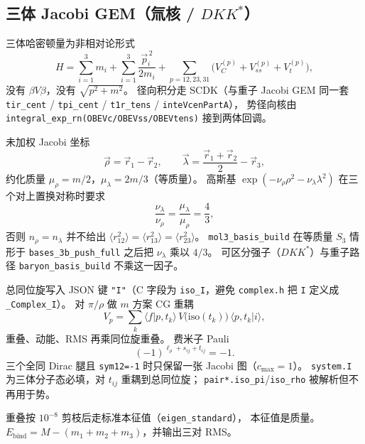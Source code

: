 \documentclass[12pt,a4paper]{article}
\begin{document}
\subsection{\texorpdfstring{三体 Jacobi GEM（氚核 / $DKK^*$）}{三体 Jacobi GEM（氚核 / DKK*）}}

三体哈密顿量为非相对论形式
\begin{equation}
\label{eq:H3}
  H=\sum_{i=1}^3 m_i
  +\sum_{i=1}^3 \frac{\vec p_i^{\,2}}{2m_i}
  +\sum_{p=12,23,31}\bigl(V_C^{(p)}+V_{ss}^{(p)}+V_t^{(p)}\bigr),
\end{equation}
没有 $\beta V\beta$，没有 $\sqrt{p^2+m^2}$。
径向积分走 SCDK（与重子 Jacobi GEM 同一套
\texttt{tir\_cent} / \texttt{tpi\_cent} / \texttt{t1r\_tens} /
\texttt{inteVcenPartA}），
势径向核由 \texttt{integral\_exp\_rn(OBEVc/OBEVss/OBEVtens)} 接到两体回调。

未加权 Jacobi 坐标
\begin{equation}
  \vec\rho=\vec r_1-\vec r_2,\qquad
  \vec\lambda=\frac{\vec r_1+\vec r_2}{2}-\vec r_3,
\end{equation}
约化质量 $\mu_\rho=m/2$，$\mu_\lambda=2m/3$（等质量）。
高斯基 $\exp(-\nu_\rho\rho^2-\nu_\lambda\lambda^2)$ 在三个对上置换对称时要求
\begin{equation}
\label{eq:nulam}
  \frac{\nu_\lambda}{\nu_\rho}=\frac{\mu_\lambda}{\mu_\rho}=\frac{4}{3},
\end{equation}
否则 $n_\rho=n_\lambda$ 并不给出 $\langle r_{12}^2\rangle=\langle r_{13}^2\rangle=\langle r_{23}^2\rangle$。
\texttt{mol3\_basis\_build} 在等质量 $S_3$ 情形于 \texttt{bases\_3b\_push\_full}
之后把 $\nu_\lambda$ 乘以 $4/3$。
可区分强子（$DKK^*$）与重子路径 \texttt{baryon\_basis\_build} 不乘这一因子。

总同位旋写入 JSON 键 \texttt{"I"}（C 字段为 \texttt{iso\_I}，避免
\texttt{complex.h} 把 \texttt{I} 定义成 \texttt{\_Complex\_I}）。
对 $\pi/\rho$ 做 $m$ 方案 CG 重耦
\begin{equation}
  V_p=\sum_k \langle f|p,t_k\rangle\, V\bigl(\mathrm{iso}(t_k)\bigr)\,
  \langle p,t_k|i\rangle,
\end{equation}
重叠、动能、RMS 再乘同位旋重叠。
费米子 Pauli
\begin{equation}
  (-1)^{\ell_\rho+s_{ij}+t_{ij}}=-1.
\end{equation}
三个全同 Dirac 腿且 \texttt{sym12=-1} 时只保留一张 Jacobi 图（$c_{\max}=1$）。
\texttt{system.I} 为三体分子态必填，对 \(t_{ij}\) 重耦到总同位旋；
\texttt{pair*.iso\_pi}/\texttt{iso\_rho} 被解析但不再用于势。

重叠按 $10^{-8}$ 剪枝后走标准本征值（\texttt{eigen\_standard}），
本征值是质量。
$E_{\mathrm{bind}}=M-(m_1+m_2+m_3)$，并输出三对 RMS。
\end{document}
